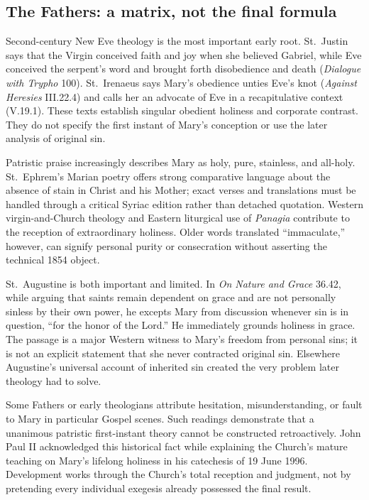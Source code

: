 \subsection{The Fathers: a matrix, not the final formula}

Second-century New Eve theology is the most important early root. St.~Justin says that the Virgin conceived faith and joy when she believed Gabriel, while Eve conceived the serpent's word and brought forth disobedience and death (\emph{Dialogue with Trypho} 100). St.~Irenaeus says Mary's obedience unties Eve's knot (\emph{Against Heresies} III.22.4) and calls her an advocate of Eve in a recapitulative context (V.19.1). These texts establish singular obedient holiness and corporate contrast. They do not specify the first instant of Mary's conception or use the later analysis of original sin.

Patristic praise increasingly describes Mary as holy, pure, stainless, and all-holy. St.~Ephrem's Marian poetry offers strong comparative language about the absence of stain in Christ and his Mother; exact verses and translations must be handled through a critical Syriac edition rather than detached quotation. Western virgin-and-Church theology and Eastern liturgical use of \emph{Panagia} contribute to the reception of extraordinary holiness. Older words translated ``immaculate,'' however, can signify personal purity or consecration without asserting the technical 1854 object.

St.~Augustine is both important and limited. In \emph{On Nature and Grace} 36.42, while arguing that saints remain dependent on grace and are not personally sinless by their own power, he excepts Mary from discussion whenever sin is in question, ``for the honor of the Lord.'' He immediately grounds holiness in grace. The passage is a major Western witness to Mary's freedom from personal sins; it is not an explicit statement that she never contracted original sin. Elsewhere Augustine's universal account of inherited sin created the very problem later theology had to solve.

Some Fathers or early theologians attribute hesitation, misunderstanding, or fault to Mary in particular Gospel scenes. Such readings demonstrate that a unanimous patristic first-instant theory cannot be constructed retroactively. John Paul II acknowledged this historical fact while explaining the Church's mature teaching on Mary's lifelong holiness in his catechesis of 19 June 1996. Development works through the Church's total reception and judgment, not by pretending every individual exegesis already possessed the final result.

